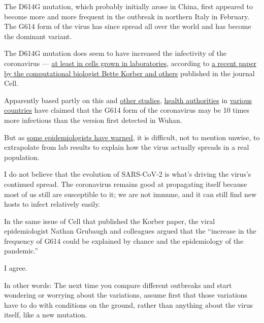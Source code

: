 The D614G mutation, which probably initially arose in China, first
appeared to become more and more frequent in the outbreak in northern
Italy in February. The G614 form of the virus has since spread all over
the world and has become the dominant variant.

The D614G mutation does seem to have increased the infectivity of the
coronavirus ---
\href{https://www.scripps.edu/news-and-events/press-room/2020/20200611-choe-farzan-sars-cov-2-spike-protein.html}{at
least in cells grown in laboratories}, according to
\href{https://www.cell.com/cell/pdf/S0092-8674(20)30820-5.pdf}{a recent
paper by the computational biologist Bette Korber and others} published
in the journal Cell.

Apparently based partly on this and
\href{https://www.scripps.edu/news-and-events/press-room/2020/20200611-choe-farzan-sars-cov-2-spike-protein.html}{other
studies},
\href{https://www.todayonline.com/world/10-times-more-infectious-d614g-coronavirus-strain-detected-malaysia}{health
authorities} in
\href{https://timesofindia.indiatimes.com/india/ten-times-more-infectious-than-coronavirus-all-you-need-to-know-about-d614g/articleshow/77586073.cms}{various
countries} have claimed that the G614 form of the coronavirus may be 10
times more infectious than the version first detected in Wuhan.

But as
\href{https://www.cell.com/cell/fulltext/S0092-8674(20)30817-5?_returnURL=https\%3A\%2F\%2Flinkinghub.elsevier.com\%2Fretrieve\%2Fpii\%2FS0092867420308175\%3Fshowall\%3Dtrue}{some
epidemiologists have warned}, it is difficult, not to mention unwise, to
extrapolate from lab results to explain how the virus actually spreads
in a real population.

I do not believe that the evolution of SARS-CoV-2 is what's driving the
virus's continued spread. The coronavirus remains good at propagating
itself because most of us still are susceptible to it; we are not
immune, and it can still find new hosts to infect relatively easily.

In the same issue of Cell that published the Korber paper, the viral
epidemiologist Nathan Grubaugh and colleagues argued that the ``increase
in the frequency of G614 could be explained by chance and the
epidemiology of the pandemic.''

I agree.

In other words: The next time you compare different outbreaks and start
wondering or worrying about the variations, assume first that those
variations have to do with conditions on the ground, rather than
anything about the virus itself, like a new mutation.

